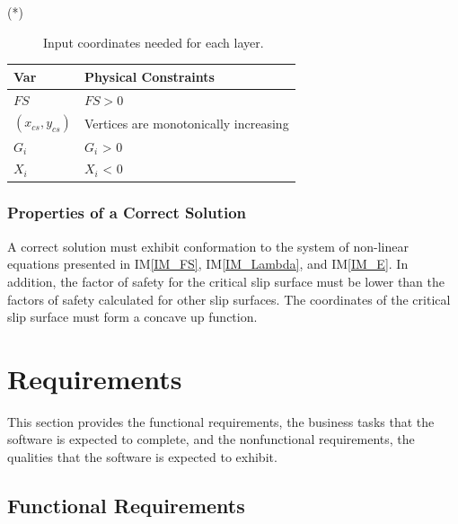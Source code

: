 \documentclass[12pt]{article}
\renewcommand{\arraystretch}{1}
\newcommand{\iref}[1]{IM\ref{#1}}
\begin{document}
\noindent \begin{description}
\item[(*)] Input coordinates needed for each layer.
\end{description}

\begin{table}[!h]
\caption{Output Variables} 
\renewcommand{\arraystretch}{1.2} 
\noindent \begin{longtable*}{l l} 
  \toprule \label{TblOutputVar}
  \textbf{Var} & \textbf{Physical Constraints} \\
  \midrule 
  $FS$ & $FS>0$ \\
  $(x_{cs},y_{cs})$ &  Vertices are monotonically increasing \\
  $G_i$ & $G_i$ > 0 \\
  $X_i$ & $X_i$ < 0 \\
  \bottomrule
\end{longtable*}
\end{table}

\subsubsection{Properties of a Correct Solution} \label{sec_CorrectSolution}

\noindent
A correct solution must exhibit conformation to the system of non-linear 
equations presented in \iref{IM_FS}, \iref{IM_Lambda}, and \iref{IM_E}. In 
addition, the factor of safety for the critical slip surface must be lower than 
the factors of safety calculated for other slip surfaces. The coordinates of 
the critical slip surface must form a concave up function.

\section{Requirements}

This section provides the functional requirements, the business tasks
that the software is expected to complete, and the nonfunctional
requirements, the qualities that the software is expected to exhibit.

\subsection{Functional Requirements}
\end{document}
